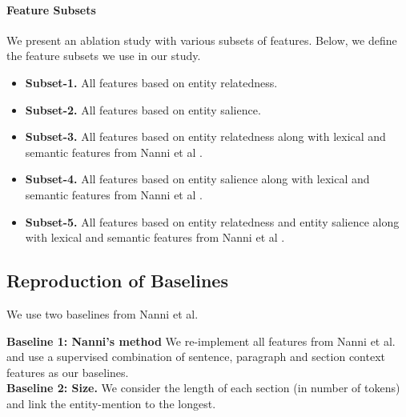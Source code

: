 \paragraph{\textbf{Feature Subsets}}
We present an ablation study with various subsets of features. Below, we define the feature subsets we use in our study.

\begin{itemize}
    \item \textbf{Subset-1.} All features based on entity relatedness.
    \item \textbf{Subset-2.} All features based on entity salience.
    \item \textbf{Subset-3.} All features based on entity relatedness along with lexical and semantic features from Nanni et al \cite{nanni2018entity}.
    \item \textbf{Subset-4.} All features based on entity salience along with lexical and semantic features from Nanni et al \cite{nanni2018entity}.
    \item \textbf{Subset-5.} All features based on entity relatedness and entity salience along with lexical and semantic features from Nanni et al \cite{nanni2018entity}.
    
    
\end{itemize}

\subsection{Reproduction of Baselines}
\label{subsec:Reproduction of Baselines}

We use two baselines from Nanni et al.

\noindent
\textbf{Baseline 1: Nanni's method} We re-implement all features from Nanni et al. \cite{nanni2018entity} and use a supervised combination of sentence, paragraph and section context features as our baselines. \\
\textbf{Baseline 2: Size.} We consider the length of each section (in number of tokens) and link the entity-mention to the longest. \\


